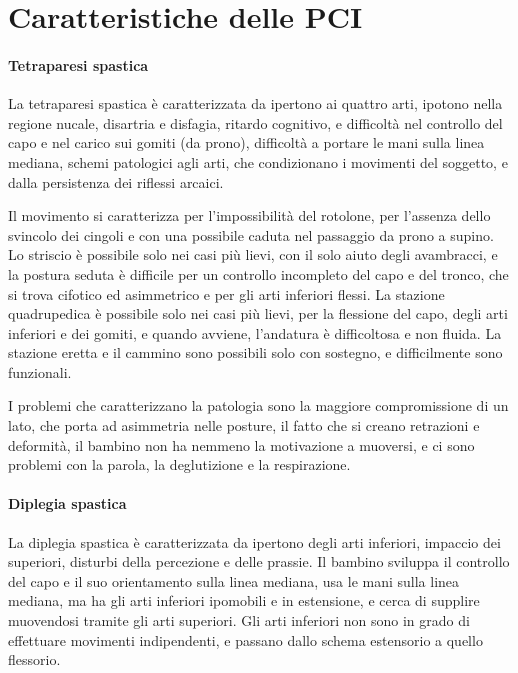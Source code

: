 \section{Caratteristiche delle PCI}
\paragraph{Tetraparesi spastica}
La tetraparesi spastica è caratterizzata da ipertono ai quattro arti, ipotono nella regione nucale, disartria e disfagia, ritardo
cognitivo, e difficoltà nel controllo del capo e nel carico sui gomiti (da prono), difficoltà a portare le mani sulla linea mediana,
schemi patologici agli arti, che condizionano i movimenti del soggetto, e dalla persistenza dei riflessi arcaici.

Il movimento si caratterizza per l'impossibilità del rotolone, per l'assenza dello svincolo dei cingoli e con una possibile caduta nel
passaggio da prono a supino. Lo striscio è possibile solo nei casi più lievi, con il solo aiuto degli avambracci, e la postura seduta è
difficile per un controllo incompleto del capo e del tronco, che si trova cifotico ed asimmetrico e per gli arti inferiori flessi.
La stazione quadrupedica è possibile solo nei casi più lievi, per la flessione del capo, degli arti inferiori e dei gomiti, e quando
avviene, l'andatura è difficoltosa e non fluida.
La stazione eretta e il cammino sono possibili solo con sostegno, e difficilmente sono funzionali.

I problemi che caratterizzano la patologia sono la maggiore compromissione di un lato, che porta ad asimmetria nelle posture, il fatto
che si creano retrazioni e deformità, il bambino non ha nemmeno la motivazione a muoversi, e ci sono problemi con la parola, la
deglutizione e la respirazione. 

\paragraph{Diplegia spastica}
La diplegia spastica è caratterizzata da ipertono degli arti inferiori, impaccio dei superiori, disturbi della percezione e delle
prassie. Il bambino sviluppa il controllo del capo e il suo orientamento sulla linea mediana, usa le mani sulla linea mediana, ma ha gli
arti inferiori ipomobili e in estensione, e cerca di supplire muovendosi tramite gli arti superiori. Gli arti inferiori non sono in
grado di effettuare movimenti indipendenti, e passano dallo schema estensorio a quello flessorio. 

